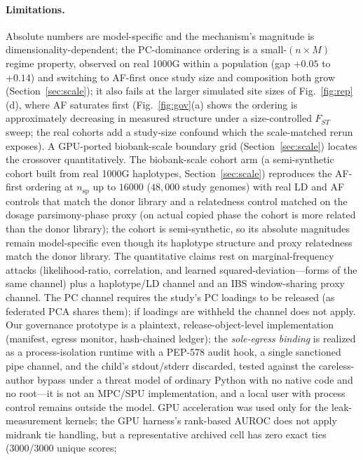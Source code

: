 \documentclass[11pt]{article}
\begin{document}
\paragraph{Limitations.} Absolute numbers are model-specific and the mechanism's
magnitude is dimensionality-dependent; the PC-dominance ordering is a
small-$(n{\times}M)$ regime property, observed on real 1000G within a population
(gap $+0.05$ to $+0.14$) and switching to AF-first once study size and composition
both grow (Section~\ref{sec:scale}); it also fails at the larger simulated site
sizes of Fig.~\ref{fig:rep}(d), where AF saturates first
(Fig.~\ref{fig:gov}(a) shows the ordering is approximately decreasing in measured structure under
a size-controlled $F_{ST}$ sweep; the real cohorts add a study-size confound
which the scale-matched rerun exposes). A GPU-ported biobank-scale
boundary grid (Section~\ref{sec:scale}) locates the crossover quantitatively.
The biobank-scale cohort arm (a semi-synthetic cohort built from real 1000G
haplotypes, Section~\ref{sec:scale}) reproduces the AF-first ordering at
$n_{\text{sp}}$ up to $16000$ ($48{,}000$ study genomes) with real LD and AF
controls that match the donor library and a relatedness control matched on the
dosage parsimony-phase proxy (on actual copied phase the cohort is more related
than the donor library); the cohort is semi-synthetic,
so its
absolute magnitudes remain model-specific even though its haplotype structure and
proxy relatedness match the donor library.
The quantitative
claims rest on marginal-frequency attacks (likelihood-ratio, correlation, and
learned squared-deviation---forms of the same channel) plus a haplotype/LD
channel and an IBS window-sharing proxy channel. The PC channel requires the study's PC
loadings to be released (as federated PCA shares them); if loadings are withheld
the channel does not apply. Our governance prototype is a plaintext,
release-object-level implementation (manifest, egress monitor, hash-chained
ledger); the \emph{sole-egress binding} is realized as a process-isolation
runtime with a PEP-578 audit hook, a single sanctioned pipe channel, and the
child's stdout/stderr discarded, tested
against the careless-author bypass under a threat model of ordinary Python with
no native code and no root---it is not an MPC/SPU implementation, and a local
user with process control remains outside the model. GPU
acceleration was used only for the leak-measurement kernels; the GPU harness's
rank-based AUROC does not apply midrank tie handling, but a representative
archived cell has zero exact ties (3000/3000 unique scores;
\end{document}
